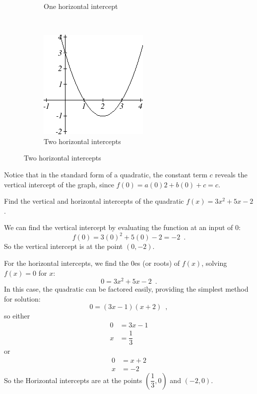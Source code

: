 \begin{figure}[!ht]
\begin{subfigure}[b]{0.3\textwidth}
        \caption{One horizontal intercept}
    \end{subfigure}
    ~
    \begin{subfigure}[b]{0.3\textwidth}
        \includegraphics[width=\textwidth]{img/chap1/sec1-5/image060.png}
        \caption{Two horizontal intercepts}
    \end{subfigure}
\end{figure}

Notice that in the standard form of a quadratic, the constant term $c$ reveals the vertical intercept of the graph, since $f(0)=a(0)2+b(0)+c=c$.

\begin{example}
Find the vertical and horizontal intercepts of the quadratic $f(x)=3x^2+5x-2$.

\begin{solution} We can find the vertical intercept by evaluating the function at an input of $0$:
$$f(0)=3(0)^2+5(0)-2=-2 \enspace .$$
So the vertical intercept is at the point $(0,-2)$.

For the horizontal intercepts, we find the 0es (or roots) of $f(x)$, solving $f(x) = 0$ for $x$:
$$0=3x^2+5x-2 \enspace .$$
In this case, the quadratic can be factored easily, providing the simplest method for solution:
$$0=(3x-1)(x+2) \enspace ,$$
so either
\begin{align*}
		0 &= 3x-1\\
		x &= \dfrac{1}{3}
	\end{align*}
or
\begin{align*}
		0 &= x+2\\
		x &= -2
\end{align*}
So the Horizontal intercepts are at the points $\left(\dfrac{1}{3},0\right)$ and $(-2,0)$.
\end{solution}\end{example}

